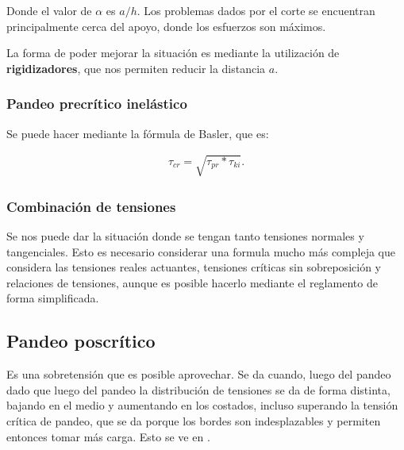 \documentclass[../main.tex]{subfiles}
\begin{document}
Donde el valor de $\alpha$ es  $a/h$. Los problemas dados por el corte se
encuentran principalmente cerca del apoyo, donde los esfuerzos son máximos.

La forma de poder mejorar la situación es mediante la utilización de
\textbf{rigidizadores}, que nos permiten reducir la distancia $a$. 

\subsubsection{Pandeo precrítico inelástico}

Se puede hacer mediante la fórmula de Basler, que es:

\begin{align*}
  \tau_{cr} = \sqrt{\tau_{pr}*\tau_{ki}} 
.\end{align*}

\subsubsection{Combinación de tensiones}

Se nos puede dar la situación donde se tengan tanto tensiones normales y 
tangenciales. Esto es necesario considerar una formula mucho más compleja que
considera las tensiones reales actuantes, tensiones críticas sin sobreposición
y relaciones de tensiones, aunque es posible hacerlo mediante el reglamento
de forma simplificada.

\subsection{Pandeo poscrítico}

Es una sobretensión que es posible aprovechar. Se da cuando, luego del pandeo 
dado que luego del pandeo la distribución de tensiones se da de forma distinta,
bajando en el medio y aumentando en los costados, incluso superando la tensión
crítica de pandeo, que se da porque los bordes son indesplazables y permiten
entonces tomar más carga. Esto se ve en .
\end{document}
